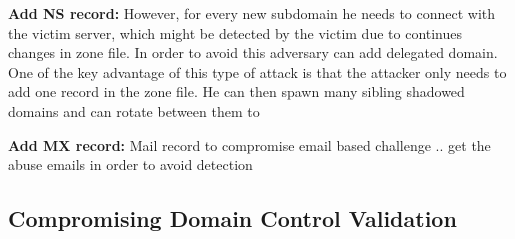 \textbf{Add NS record:}
However, for every new subdomain he needs to connect with the victim server, which might be detected by the victim due to continues changes in zone file. In order to avoid this adversary can add delegated domain. One of the key advantage of this type of attack is that the attacker only needs to add one record in the zone file. He can then spawn many sibling shadowed domains and can rotate between them to 

\textbf{ Add MX record:} 
Mail record to compromise email based challenge .. get the abuse emails in order to avoid detection 

\subsection{Compromising Domain Control Validation}